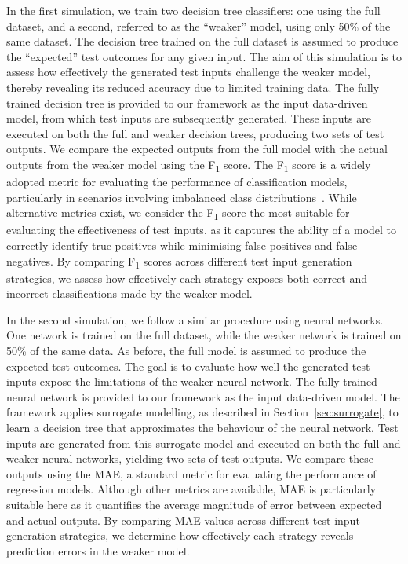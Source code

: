 \documentclass[
]{ceurart}
\theoremstyle{definition}
\begin{document}
In the first simulation, we train two decision tree classifiers: one using the full dataset, and a second, referred to as the “weaker” model, using only 50\% of the same dataset. The decision tree trained on the full dataset is assumed to produce the “expected” test outcomes for any given input. The aim of this simulation is to assess how effectively the generated test inputs challenge the weaker model, thereby revealing its reduced accuracy due to limited training data. The fully trained decision tree is provided to our framework as the input data-driven model, from which test inputs are subsequently generated. These inputs are executed on both the full and weaker decision trees, producing two sets of test outputs. We compare the expected outputs from the full model with the actual outputs from the weaker model using the F\textsubscript{1} score. The F\textsubscript{1} score is a widely adopted metric for evaluating the performance of classification models, particularly in scenarios involving imbalanced class distributions~\cite{mlbook}. While alternative metrics exist, we consider the F\textsubscript{1} score the most suitable for evaluating the effectiveness of test inputs, as it captures the ability of a model to correctly identify true positives while minimising false positives and false negatives. By comparing F\textsubscript{1} scores across different test input generation strategies, we assess how effectively each strategy exposes both correct and incorrect classifications made by the weaker model.

In the second simulation, we follow a similar procedure using neural networks. One network is trained on the full dataset, while the weaker network is trained on 50\% of the same data. As before, the full model is assumed to produce the expected test outcomes. The goal is to evaluate how well the generated test inputs expose the limitations of the weaker neural network. The fully trained neural network is provided to our framework as the input data-driven model. The framework applies surrogate modelling, as described in Section~\ref{sec:surrogate}, to learn a decision tree that approximates the behaviour of the neural network. Test inputs are generated from this surrogate model and executed on both the full and weaker neural networks, yielding two sets of test outputs. We compare these outputs using the MAE, a standard metric for evaluating the performance of regression models. Although other metrics are available, MAE is particularly suitable here as it quantifies the average magnitude of error between expected and actual outputs. By comparing MAE values across different test input generation strategies, we determine how effectively each strategy reveals prediction errors in the weaker model.
\end{document}
